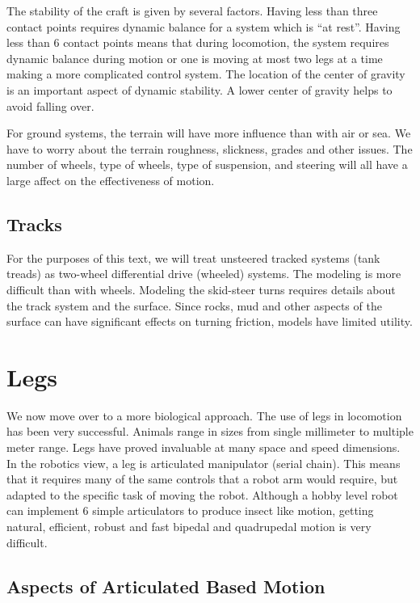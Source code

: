 The stability of the craft is given by several factors. Having less than
three contact points requires dynamic balance for a system which is ``at
rest''. Having less than 6 contact points means that during locomotion,
the system requires dynamic balance during motion or one is moving at
most two legs at a time making a more complicated control system. The
location of the center of gravity is an important aspect of dynamic
stability. A lower center of gravity helps to avoid falling over.

For ground systems, the terrain will have more influence than with air
or sea. We have to worry about the terrain roughness, slickness, grades
and other issues. The number of wheels, type of wheels, type of
suspension, and steering will all have a large affect on the
effectiveness of motion.

\hypertarget{tracks}{%
\subsection{Tracks}\label{tracks}}

For the purposes of this text, we will treat unsteered tracked systems
(tank treads) as two-wheel differential drive (wheeled) systems. The
modeling is more difficult than with wheels. Modeling the skid-steer
turns requires details about the track system and the surface. Since
rocks, mud and other aspects of the surface can have significant effects
on turning friction, models have limited utility.

\hypertarget{legs}{%
\section{Legs}\label{legs}}

We now move over to a more biological approach. The use of legs in
locomotion has been very successful. Animals range in sizes from single
millimeter to multiple meter range. Legs have proved invaluable at many
space and speed dimensions. In the robotics view, a leg is articulated
manipulator (serial chain). This means that it requires many of the same
controls that a robot arm would require, but adapted to the specific
task of moving the robot. Although a hobby level robot can implement 6
simple articulators to produce insect like motion, getting natural,
efficient, robust and fast bipedal and quadrupedal motion is very
difficult.

\hypertarget{aspects-of-articulated-based-motion}{%
\subsection{Aspects of Articulated Based
Motion}\label{aspects-of-articulated-based-motion}}

